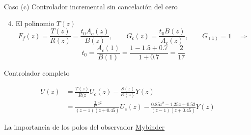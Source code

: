 \documentclass[presentation,aspectratio=169]{beamer}
\begin{document}
\begin{frame}[label={sec:org3e085e2}]{Caso (c) Controlador incremental sin cancelación del cero}
\begin{enumerate}
\setcounter{enumi}{3}
\item \alert{El polinomio \(T(z)\)}  \[F_f(z) = \frac{T(z)}{R(z)} = \frac{t_0 A_o(z)}{B(z)}, \qquad G_c(z) = \frac{t_0 B(z)}{A_c(z)}, \qquad G_(1) = 1 \quad\Rightarrow \]
\alert{\[ t_0 = \frac{A_c(1)}{B(1)} = \frac{1 - 1.5 + 0.7}{1+0.7} = \frac{2}{17}\]}
\end{enumerate}

Controlador completo

\begin{align*}
U(z) &= \frac{T(z)}{R(z}U_c(z) - \frac{S(z)}{R(z)}Y(z) \\
     &= \frac{\frac{2}{17}z^2}{(z-1)(z+0.45)}U_c(z) - \frac{0.85z^2 - 1.25z + 0.52}{(z-1)(z+0.45)} Y(z)
     \end{align*}
\end{frame}

\begin{frame}[label={sec:org0df5cac}]{La importancia de los polos del observador}
\href{https://mybinder.org/v2/gh/kjartan-at-tec/mr2007-computerized-control/master?filepath=.\%2Fpolynomal-design/notebooks/A-and-W-5.3.ipynb}{Mybinder}
\end{frame}
\end{document}
